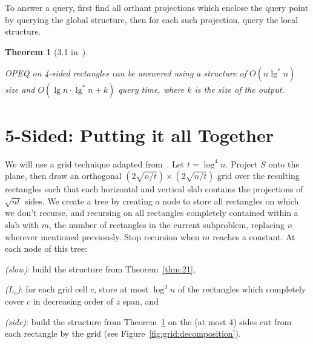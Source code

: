 \documentclass[letterpaper,12pt,twocolumn]{article}
\newcommand{\BigOh}[1]{O\!\left(#1\right)}
\theoremstyle{plain}
\newtheorem{theorem}{Theorem}
\begin{document}
To answer a query, first find all orthant projections which enclose
the query point by querying the global structure, then for each such
projection, query the local structure.

\begin{theorem}[3.1 in~\cite{saladi2015improved}]\label{thm:31}

  OPEQ on 4-sided rectangles can be answered using a structure of
  $\BigOh{n\lg^* n}$ size and $\BigOh{\lg n \cdot \lg^* n + k}$
  query time, where $k$ is the size of the output.

\end{theorem}

\section{5-Sided: Putting it all Together}

We will use a grid technique adapted from~\cite{alstrup2000new}.  Let
$t = \log^4 n$.  Project $S$ onto the plane, then draw an orthogonal
$(2\sqrt{n/t})\times(2\sqrt{n/t})$ grid over the resulting rectangles
such that each horizontal and vertical slab contains the projections
of $\sqrt{nt}$ sides.  We create a tree by creating a node to store
all rectangles on which we don't recurse, and recursing on all
rectangles completely contained within a slab with $m$, the number of
rectangles in the current subproblem, replacing $n$ wherever mentioned
previously.  Stop recursion when $m$ reaches a constant.  At each node
of this tree:
%
\begin{enumerate*}[label=(\roman*)] %
\item \emph{(slow)}: build the structure from Theorem~\ref{thm:21},
\item \emph{($L_c$)}: for each grid cell $c$, store at most $\log^3 n$
  of the rectangles which completely cover $c$ in decreasing order of
  $z$ span, and
\item \emph{(side)}: build the structure from Theorem~\ref{thm:31} on
  the (at most 4) sides cut from each rectangle by the grid (see
  Figure~\ref{fig:grid:decomposition}).
\end{enumerate*}
\end{document}
